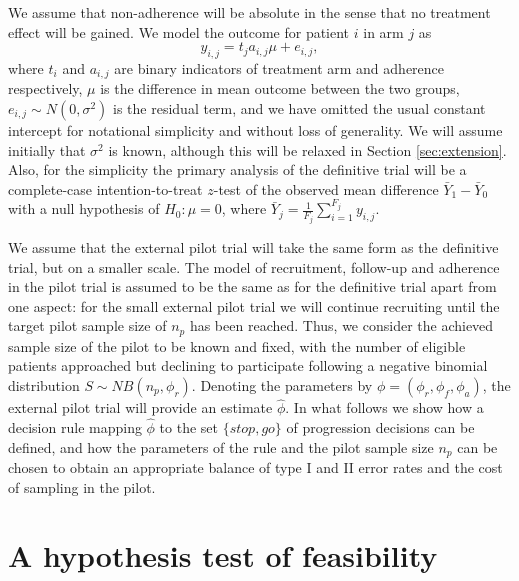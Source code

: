\documentclass[AMA,STIX1COL]{WileyNJD-v2}
\begin{document}
We assume that non-adherence will be absolute in the sense that no treatment effect will be gained. We model the outcome for patient $i$ in arm $j$ as
$$
y_{i,j} = t_j a_{i,j} \mu + e_{i,j},
$$
where $t_i$ and $a_{i,j}$ are binary indicators of treatment arm and adherence respectively, $\mu$ is the difference in mean outcome between the two groups, $e_{i,j} \sim N(0, \sigma^2)$ is the residual term, and we have omitted the usual constant intercept for notational simplicity and without loss of generality. We will assume initially that $\sigma^2$ is known, although this will be relaxed in Section \ref{sec:extension}. Also, for the simplicity the primary analysis of the definitive trial will be a complete-case intention-to-treat $z$-test of the observed mean difference $\bar{Y}_1 - \bar{Y}_0$ with a null hypothesis of $H_0: \mu = 0$, where $\bar{Y}_j = \frac{1}{F_j} \sum_{i=1}^{F_j} y_{i,j}$.

We assume that the external pilot trial will take the same form as the definitive trial, but on a smaller scale. The model of recruitment, follow-up and adherence in the pilot trial is assumed to be the same as for the definitive trial apart from one aspect: for the small external pilot trial we will continue recruiting until the target pilot sample size of $n_p$ has been reached. Thus, we consider the achieved sample size of the pilot to be known and fixed, with the number of eligible patients approached but declining to participate following a negative binomial distribution $S \sim NB(n_p, \phi_r)$. Denoting the parameters by $\phi = (\phi_r, \phi_f, \phi_a)$, the external pilot trial will provide an estimate $\hat{\phi}$. In what follows we show how a decision rule mapping $\hat{\phi}$ to the set $\{stop, go\}$ of progression decisions can be defined, and how the parameters of the rule and the pilot sample size $n_p$ can be chosen to obtain an appropriate balance of type I and II error rates and the cost of sampling in the pilot.

\section{A hypothesis test of feasibility}\label{sec:methods}

\end{document}
